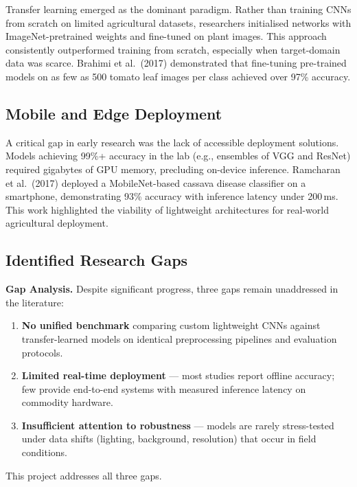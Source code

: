 \parsp
Transfer learning emerged as the dominant paradigm. Rather than training CNNs
from scratch on limited agricultural datasets, researchers initialised
networks with ImageNet-pretrained weights and fine-tuned on plant images.
This approach consistently outperformed training from scratch, especially
when target-domain data was scarce. Brahimi et al.\ (2017) demonstrated that
fine-tuning pre-trained models on as few as 500 tomato leaf images per class
achieved over 97\% accuracy.

\subsection{Mobile and Edge Deployment}

A critical gap in early research was the lack of accessible deployment
solutions. Models achieving 99\%+ accuracy in the lab (e.g., ensembles of
VGG and ResNet) required gigabytes of GPU memory, precluding on-device
inference. Ramcharan et al.\ (2017) deployed a MobileNet-based cassava
disease classifier on a smartphone, demonstrating 93\% accuracy with
inference latency under 200\,ms. This work highlighted the viability of
lightweight architectures for real-world agricultural deployment.

\subsection{Identified Research Gaps}

\begin{defbox}
\textbf{Gap Analysis.} Despite significant progress, three gaps remain
unaddressed in the literature:

\begin{enumerate}[label=\textcolor{accent}{\textbullet}, leftmargin=2em, itemsep=3pt]
  \item \textbf{No unified benchmark} comparing custom lightweight CNNs
        against transfer-learned models on identical preprocessing
        pipelines and evaluation protocols.
  \item \textbf{Limited real-time deployment} — most studies report offline
        accuracy; few provide end-to-end systems with measured inference
        latency on commodity hardware.
  \item \textbf{Insufficient attention to robustness} — models are rarely
        stress-tested under data shifts (lighting, background, resolution)
        that occur in field conditions.
\end{enumerate}

This project addresses all three gaps.
\end{defbox}

